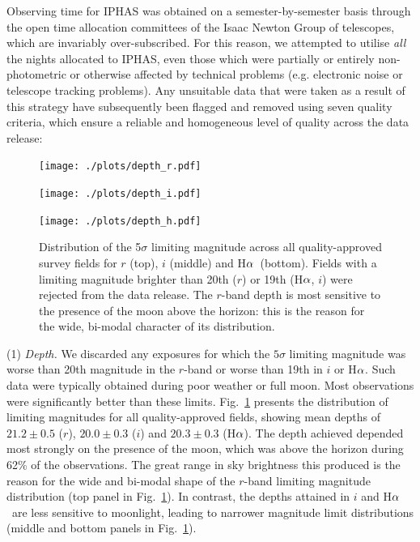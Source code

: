 \documentclass[useAMS,usenatbib]{mn2e}
\def\ha{\mbox{H$\rm \alpha$}}
\begin{document}
Observing time for IPHAS was obtained
on a semester-by-semester basis
through the open time allocation committees 
of the Isaac Newton Group of telescopes,
which are invariably over-subscribed.
For this reason, we attempted to utilise 
\emph{all} the nights allocated to IPHAS,
even those which were partially or entirely non-photometric
or otherwise affected by technical problems 
(e.g. electronic noise or telescope tracking problems).
Any unsuitable data that were taken as a result
of this strategy have subsequently been flagged and removed
using seven quality criteria,
which ensure a reliable and homogeneous level of quality
across the data release:

\begin{figure}
    \begin{minipage}[b]{\linewidth}
        \texttt{[image: ./plots/depth\_r.pdf]} 
    \end{minipage}
    \begin{minipage}[b]{\linewidth}
        \texttt{[image: ./plots/depth\_i.pdf]} 
    \end{minipage}
    \begin{minipage}[b]{\linewidth}
        \texttt{[image: ./plots/depth\_h.pdf]} 
    \end{minipage}
    \caption{Distribution of the 5$\sigma$ limiting magnitude
             across all quality-approved survey fields
             for $r$ (top), $i$ (middle) and \ha\ (bottom).
             Fields with a limiting magnitude brighter than
             20th ($r$) or 19th (\ha, $i$) were rejected
             from the data release.
             The $r$-band depth is most sensitive 
             to the presence of the moon above the horizon: 
             this is the reason for the wide, bi-modal character
             of its distribution.}
    \label{fig:depth}
\end{figure}

(1) \emph{Depth.} 
We discarded any exposures for which the $5\sigma$ limiting magnitude 
was worse than 20th magnitude in the $r$-band
or worse than 19th in $i$ or \ha. 
Such data were typically obtained during poor weather or full moon.
Most observations were significantly better than these limits.
Fig.~\ref{fig:depth} presents the distribution of limiting magnitudes
for all quality-approved fields,
showing mean depths of 
$21.2\pm0.5$ ($r$), $20.0\pm0.3$ ($i$) and $20.3\pm0.3$ (\ha).
The depth achieved depended 
most strongly on the presence of the moon,
which was above the horizon during 62\% 
of the observations.  The great range in sky brightness this
produced is the reason for the wide and bi-modal shape
of the $r$-band limiting magnitude distribution 
(top panel in Fig.~\ref{fig:depth}).
In contrast, the depths attained in $i$ and \ha\ 
are less sensitive to moonlight, leading to
narrower magnitude limit distributions
(middle and bottom panels in Fig.~\ref{fig:depth}).
\end{document}
